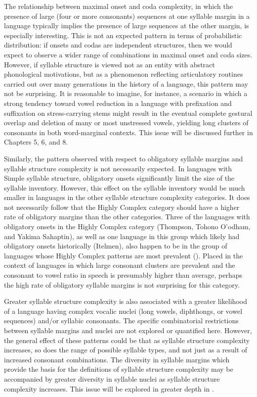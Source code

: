 The relationship between maximal onset and coda complexity, in which the presence of large (four or more consonants) sequences at one syllable margin in a language typically implies the presence of large sequences at the other margin, is especially interesting. This is not an expected pattern in terms of probabilistic distribution: if onsets and codas are independent structures, then we would expect to observe a wider range of combinations in maximal onset and coda sizes. However, if syllable structure is viewed not as an entity with abstract phonological motivations, but as a phenomenon reflecting articulatory routines carried out over many generations in the history of a language, this pattern may not be surprising. It is reasonable to imagine, for instance, a scenario in which a strong tendency toward vowel reduction in a language with prefixation and suffixation on stress-carrying stems might result in the eventual complete gestural overlap and deletion of many or most unstressed vowels, yielding long clusters of consonants in both word-marginal contexts. This issue will be discussed further in Chapters 5, 6, and 8.

Similarly, the pattern observed with respect to obligatory syllable margins and syllable structure complexity is not necessarily expected. In languages with Simple syllable structure, obligatory onsets significantly limit the size of the syllable inventory. However, this effect on the syllable inventory would be much smaller in languages in the other syllable structure complexity categories. It does not necessarily follow that the Highly Complex category should have a higher rate of obligatory margins than the other categories. Three of the languages with obligatory onsets in the Highly Complex category (Thompson, Tohono O’odham, and Yakima Sahaptin), as well as one language in this group which likely had obligatory onsets historically (Itelmen), also happen to be in the group of languages whose Highly Complex patterns are most prevalent (). Placed in the context of languages in which large consonant clusters are prevalent and the consonant to vowel ratio in speech is presumably higher than average, perhaps the high rate of obligatory syllable margins is not surprising for this category.

Greater syllable structure complexity is also associated with a greater likelihood of a language having complex vocalic nuclei (long vowels, diphthongs, or vowel sequences) and/or syllabic consonants. The specific combinatorial restrictions between syllable margins and nuclei are not explored or quantified here. However, the general effect of these patterns could be that as syllable structure complexity increases, so does the range of possible syllable types, and not just as a result of increased consonant combinations. The diversity in syllable margins which provide the basis for the definitions of syllable structure complexity may be accompanied by greater diversity in syllable nuclei as syllable structure complexity increases. This issue will be explored in greater depth in .

